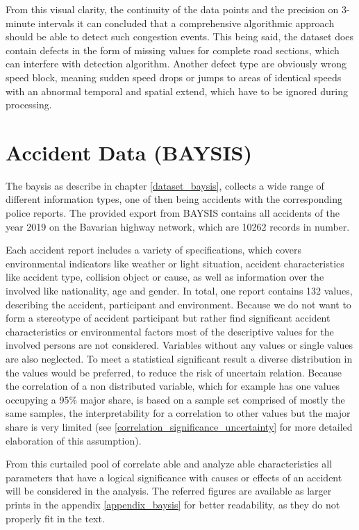 From this visual clarity, the continuity of the data points and the precision on 3-minute intervals it can concluded that a comprehensive algorithmic approach should be able to detect such congestion events. This being said, the dataset does contain defects in the form of missing values for complete road sections, which can interfere with detection algorithm. Another defect type are obviously wrong speed block, meaning sudden speed drops or jumps to areas of identical speeds with an abnormal temporal and spatial extend, which have to be ignored during processing. 

\section{Accident Data (BAYSIS)}
\label{dataset_baysis}

The \acrfull{baysis} as describe in chapter \autoref{dataset_baysis}, collects a wide range of different information types, one of then being accidents with the corresponding police reports. The provided export from BAYSIS contains all accidents of the year 2019 on the Bavarian highway network, which are 10262 records in number. 

Each accident report includes a variety of specifications, which covers environmental indicators like weather or light situation, accident characteristics like accident type, collision object or cause, as well as information over the involved like nationality, age and gender. In total, one report contains 132 values, describing the accident, participant and environment. Because we do not want to form a stereotype of accident participant but rather find significant accident characteristics or environmental factors most of the descriptive values for the involved persons are not considered. Variables without any values or single values are also neglected. To meet a statistical significant result a diverse distribution in the values would be preferred, to reduce the risk of uncertain relation. Because the correlation of a non distributed variable, which for example has one values occupying a 95\% major share, is based on a sample set comprised of mostly the same samples, the interpretability for a correlation to other values but the major share is very limited (see \autoref{correlation_significance_uncertainty} for more detailed elaboration of this assumption).

From this curtailed pool of correlate able and analyze able characteristics all parameters that have a logical significance with causes or effects of an accident will be considered in the analysis.  The referred figures are available as larger prints in the appendix \autoref{appendix_baysis} for better readability, as they do not properly fit in the text. 

